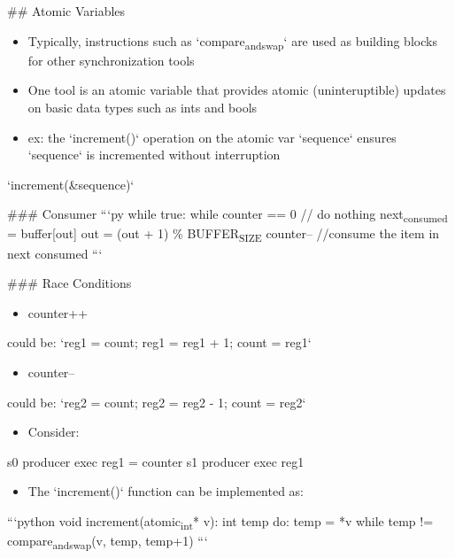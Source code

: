 \documentclass[11pt]{article}
\begin{document}
\#\# Atomic Variables
\begin{itemize}
\item Typically, instructions such as `compare\textsubscript{and}\textsubscript{swap}` are used as building blocks for other synchronization tools
\item One tool is an atomic variable that provides atomic (uninteruptible) updates on basic data types such as ints and bools
\item ex: the `increment()` operation on the atomic var `sequence` ensures `sequence` is incremented without interruption
\end{itemize}
`increment(\&sequence)`

\#\#\# Consumer
```py
while true:
  while counter == 0
    // do nothing
  next\textsubscript{consumed} = buffer[out]
  out = (out + 1) \% BUFFER\textsubscript{SIZE}
  counter--
  //consume the item in next consumed
```

\#\#\# Race Conditions
\begin{itemize}
\item counter++
\end{itemize}
could be: `reg1 = count; reg1 = reg1 + 1; count = reg1`
\begin{itemize}
\item counter--
\end{itemize}
could be: `reg2 = count; reg2 = reg2 - 1; count = reg2`
\begin{itemize}
\item Consider:
\end{itemize}
s0 producer exec reg1 = counter
s1 producer exec reg1  

\begin{itemize}
\item The `increment()` function can be implemented as:
\end{itemize}
```python
void increment(atomic\textsubscript{int}* v):
  int temp
  do:
    temp = *v
  while temp != compare\textsubscript{and}\textsubscript{swap}(v, temp, temp+1)
```
\end{document}
